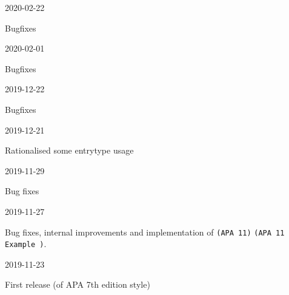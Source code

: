 \documentclass{ltxdockit}
\newcommand\apa[2][]{\ifthenelse{\equal{#1}{}}%
                       {\texttt{(APA #2)}}%
                       {\texttt{(APA #2 Example #1)}}}
\begin{document}
\begin{changelog}
\begin{release}{9.6}{2020-02-22}
\item Bugfixes
\end{release}

\begin{release}{9.5}{2020-02-01}
\item Bugfixes
\end{release}

\begin{release}{9.4}{2019-12-22}
\item Bugfixes
\end{release}

\begin{release}{9.3}{2019-12-21}
\item Rationalised some entrytype usage
\end{release}

\begin{release}{9.2}{2019-11-29}
\item Bug fixes
\end{release}
  
\begin{release}{9.1}{2019-11-27}
\item Bug fixes, internal improvements and implementation of \apa{11}.
\end{release}

\begin{release}{9.0}{2019-11-23}
\item First release (of APA 7th edition style)
\end{release}

\end{changelog}
\end{document}

